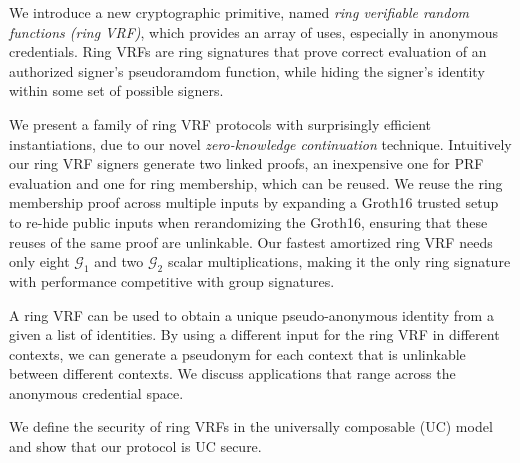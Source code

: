 
\def\eprintsmallskip{\smallskip}{}%
We introduce a new cryptographic primitive, named
 \emph{ring verifiable random functions (ring VRF)},
 which provides an array of uses, especially in anonymous credentials.
Ring VRFs are ring signatures that prove correct evaluation
of an authorized signer's pseudoramdom function, while hiding the signer's
identity within some set of possible signers.

We present a family of ring VRF protocols with surprisingly efficient
instantiations, due to our novel {\em zero-knowledge continuation} technique.
Intuitively our ring VRF signers generate two linked proofs, an inexpensive
 one for PRF evaluation and one for ring membership, which can be reused. 
We reuse the ring membership proof across multiple inputs
by expanding a Groth16 trusted setup to re-hide public inputs when
 rerandomizing the Groth16, ensuring that these reuses of the same proof are unlinkable.
Our fastest amortized ring VRF needs only eight $\mathcal{G}_1$
 and two $\mathcal{G}_2$ scalar multiplications, 
making it the only ring signature with performance competitive with group signatures.

\eprintsmallskip

A ring VRF can be used to obtain a unique pseudo-anonymous identity from a given a list of identities.
By using a different input for the ring VRF in different contexts, we can generate a pseudonym for each context that is unlinkable between different contexts. We discuss applications that range across the anonymous credential space.



\eprintsmallskip
We define the security of ring VRFs in the universally composable (UC) model and show that our protocol is UC secure.
